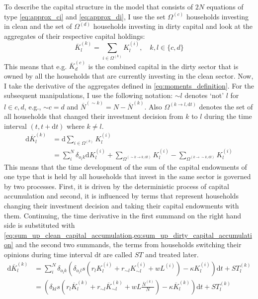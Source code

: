 To describe the capital structure in the model that consists of $2N$ equations of type \cref{eq:approx_ci} and \cref{eq:approx_di}, I use the set $\Omega^{(c)}$ households investing in clean and the set of $\Omega^{(d)}$ households investing in dirty capital and look at the aggregates of their respective capital holdings:
\begin{equation}
  \overbar{K}_l^{(k)} = \sum_{i \in \Omega^{(k)}} K_l^{(i)}, \quad k, l \in \{c, d\}
	\label{eq:moments_definition}
\end{equation}
This means that e.g. $\overbar{K}_d^{(c)}$ is the combined capital in the dirty sector that is owned by all the households that are currently investing in the clean sector.
Now, I take the derivative of the aggregates defined in \cref{eq:moments_definition}. For the subsequent manipulations, I use the following notation: $\sim l$ denotes `not' $l$ for $l \in {c, d}$, e.g., $\sim c = d$ and $\overbar{N}^{(\sim k)} = N - \overbar{N}^{(k)}$. Also $\Omega^{(k \rightarrow l, \mathrm{d}t)}$ denotes the set of all households that changed their investment decision from $k$ to $l$ during the time interval $(t, t+\mathrm{d}t)$ where $k \neq l$. 
\begin{align}
\mathrm{d}\overbar{K}_l^{(k)} &= \mathrm{d} \sum_{i \in \Omega^{(k)}} K_l^{(i)} \\ \nonumber
&= \sum_{i}^{N} \delta_{o_ik} \mathrm{d}K_l^{(i)} + \sum_{\Omega^{(\sim k \rightarrow k, \mathrm{d}t)}} K_l^{(i)} - \sum_{\Omega^{( k \rightarrow \sim k, \mathrm{d}t)}} K_l^{(i)}
  \label{eq:approx_agg_capital_time_deriv}
\end{align}
This means that the time development of the sum of the capital endowments of one type that is held by all households that invest in the same sector is governed by two processes. First, it is driven by the deterministic process of capital accumulation and second, it is influenced by terms that represent households changing their investment decision and taking their capital endowments with them. 
Continuing, the time derivative in the first summand on the right hand side is substituted with \cref{eq:sum_up_clean_capital_accumulation,eq:sum_up_dirty_capital_accumulation} and the second two summands, the terms from households switching their opinions during time interval $\mathrm{d}t$ are called $ST$ and treated later.
\begin{align}
  \mathrm{d}\overbar{K}_l^{(k)} &= \sum_{i}^{N} \delta_{o_ik} \left( \delta_{o_il}s\left( r_l K_l^{(i)} + r_{\sim l} K_{\sim l}^{(i)} + w L^{(i)} \right) -\kappa K_l^{(i)} \right)\mathrm{d}t + ST_{l}^{(k)} \\
  &= \left(\delta_{kl} s\left( r_l \overbar{K}_l^{(k)} + r_{\sim l} \overbar{K}_{\sim l}^{(k)} + w  L \frac{\overbar{N}^{(k)}}{N} \right) - \kappa \overbar{K}_l^{(k)} \right)\mathrm{d}t + ST_{l}^{(k)} \label{eq:mc_step2}
\end{align}

